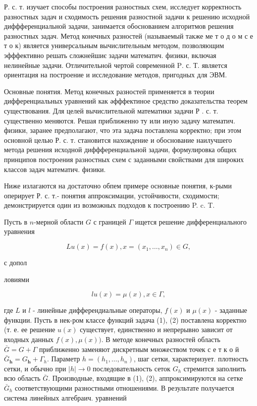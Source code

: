 \documentclass[10pt]{article}
\begin{document}
Р. с. т. изучает способы построения разностных схем, исследует корректность разностных задач и сходимость решения разностной задачи к решению исходной диффференциальной задачи, занимается обоснованием алгоритмов решения разностных задач. Метод конечных разностей (называемый также ме т о д о м с е т о к) является универсальным вычислительным методом, позволяющим эфффективно решать сложнейшиє задачи математич. физики, включая нелинейные задачи. Отличительной чертой современной $\mathrm{P}$. с. Т. является ориентация на построение и исследование методов, пригодных для ЭВМ.



Основные понятия. Метод конечных разностей применяется в теории дифференциальных уравнений как әфффектиное средство доказательства теорем существования. Для целей вычислительной математики задачи Р . с. т. существенно меняются. Решая приближенно ту или иную задачу математич. физики, заранее предполагают, что эта задача поставлена корректно; при этом основной целью Р. с. т. становится нахождение и обоснование наилучшего метода решения исходной диффференциальной задачи, формулировка общих принципов построения разностных схем с заданными свойствами для широких классов задач математич. физики.



Ниже излагаются на достаточно обпем примере основные понятия, к-рыми оперирует Р. с. т.- понятия аппроксимации, устойчивости, сходимости; демонстрируется один из возможных подходов к построению P. c. T.



Пусть в $n$-мерной области $G$ с границей $\Gamma$ ищется решение дифференциального уравнения



\[

L u(x)=f(x), x=\left(x_{1}, \ldots, x_{n}\right) \in G,

\]



с допол

ловиями



\[

l u(x)=\mu(x), x \in \Gamma,

\]



где $L$ и $l$ - линейные дифферендиальные операторы, $f(x)$ и $\mu(x)$ - заданные функции. Пусть в нек-ром классе функций задача (1), (2) поставлена корректно (т. е. ее решение $u(x)$ существует, единственно и непрерывно зависит от входных данных $f(x), \mu(x))$. В методе конечных разностей область $\bar{G}=G+\Gamma$ приближенно заменяют дискретным множеством точек с е т к о й $\bar{G}_{\boldsymbol{h}}=G_{\boldsymbol{h}}+\Gamma_{h}$. Параметр $h=\left(h_{1}, \ldots, h_{n}\right)$, шаг сетки, характеризует. плотность сетки, и обычно при $|h| \rightarrow 0$ последовательность сеток $G_{h}$ стремится заполнить всю область $\bar{G}$. Производные, входящие в (1), (2), аппроксимируются на сетке $\bar{G}_{h}$ соответствующими разностными отношениями. В результате получается система линейных алгебраич. уравнений
\end{document}
